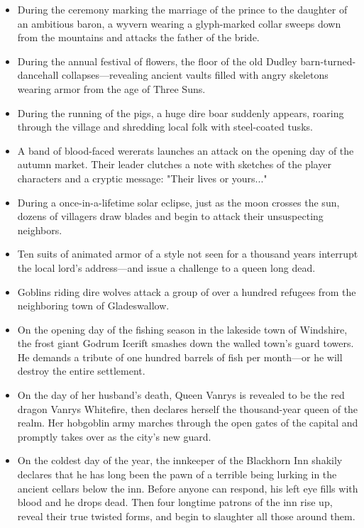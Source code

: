 \documentclass[10pt,a4paper,twoside,bg=print,twocolumn,openany,nodeprecatedcode]{dndbook}
\begin{document}
\begin{itemize}
\item During the ceremony marking the marriage of the prince to the daughter of an ambitious baron, a wyvern wearing a glyph-marked collar sweeps down from the mountains and attacks the father of the bride.
\item During the annual festival of flowers, the floor of the old Dudley barn-turned-dancehall collapses—revealing ancient vaults filled with angry skeletons wearing armor from the age of Three Suns.
\item During the running of the pigs, a huge dire boar suddenly appears, roaring through the village and shredding local folk with steel-coated tusks.
\item A band of blood-faced wererats launches an attack on the opening day of the autumn market. Their leader clutches a note with sketches of the player characters and a cryptic message: "Their lives or yours..."
\item During a once-in-a-lifetime solar eclipse, just as the moon crosses the sun, dozens of villagers draw blades and begin to attack their unsuspecting neighbors.
\item Ten suits of animated armor of a style not seen for a thousand years interrupt the local lord's address—and issue a challenge to a queen long dead.
\item Goblins riding dire wolves attack a group of over a hundred refugees from the neighboring town of Gladeswallow.
\item On the opening day of the fishing season in the lakeside town of Windshire, the frost giant Godrum Icerift smashes down the walled town's guard towers. He demands a tribute of one hundred barrels of fish per month—or he will destroy the entire settlement.
\item On the day of her husband's death, Queen Vanrys is revealed to be the red dragon Vanrys Whitefire, then declares herself the thousand-year queen of the realm. Her hobgoblin army marches through the open gates of the capital and promptly takes over as the city's new guard.
\item On the coldest day of the year, the innkeeper of the Blackhorn Inn shakily declares that he has long been the pawn of a terrible being lurking in the ancient cellars below the inn. Before anyone can respond, his left eye fills with blood and he drops dead. Then four longtime patrons of the inn rise up, reveal their true twisted forms, and begin to slaughter all those around them.
\end{itemize}
\end{document}
